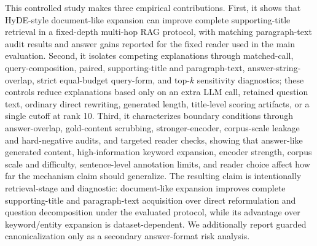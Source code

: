 This controlled study makes three empirical contributions. First, it shows that HyDE-style document-like expansion can improve complete supporting-title retrieval in a fixed-depth multi-hop RAG protocol, with matching paragraph-text audit results and answer gains reported for the fixed reader used in the main evaluation. Second, it isolates competing explanations through matched-call, query-composition, paired, supporting-title and paragraph-text, answer-string-overlap, strict equal-budget query-form, and top-$k$ sensitivity diagnostics; these controls reduce explanations based only on an extra LLM call, retained question text, ordinary direct rewriting, generated length, title-level scoring artifacts, or a single cutoff at rank 10. Third, it characterizes boundary conditions through answer-overlap, gold-content scrubbing, stronger-encoder, corpus-scale leakage and hard-negative audits, and targeted reader checks, showing that answer-like generated content, high-information keyword expansion, encoder strength, corpus scale and difficulty, sentence-level annotation limits, and reader choice affect how far the mechanism claim should generalize. The resulting claim is intentionally retrieval-stage and diagnostic: document-like expansion improves complete supporting-title and paragraph-text acquisition over direct reformulation and question decomposition under the evaluated protocol, while its advantage over keyword/entity expansion is dataset-dependent. We additionally report guarded canonicalization only as a secondary answer-format risk analysis.
